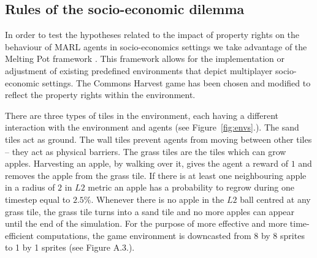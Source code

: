\documentclass[preprint,12pt,authoryear]{elsarticle}
\begin{document}
\subsection{Rules of the socio-economic dilemma}


In order to test the hypotheses related to the impact of property rights on the behaviour of MARL agents in socio-economics settings we take advantage of the Melting Pot framework \citep{Leibo2021, agapiou2023meltingpot20}. This framework allows for the implementation or adjustment of existing predefined environments that depict multiplayer socio-economic settings. The Commons Harvest game has been chosen and modified to reflect the property rights within the environment. 

There are three types of tiles in the environment, each having a different interaction with the environment and agents (see Figure~\ref{fig:envs}.). The sand tiles act as ground. The wall tiles prevent agents from moving between other tiles -- they act as physical barriers. The grass tiles are the tiles which can grow apples. Harvesting an apple, by walking over it, gives the agent a reward of $1$ and removes the apple from the grass tile. If there is at least one neighbouring apple in a radius of $2$ in $L2$ metric an apple has a probability to regrow during one timestep equal to $2.5\%$. Whenever there is no apple in the $L2$ ball centred at any grass tile, the grass tile turns into a sand tile and no more apples can appear until the end of the simulation. For the purpose of more effective and more time-efficient computations, the game environment is downcasted from 8 by 8 sprites to 1 by 1 sprites (see Figure A.3.).

\end{document}
